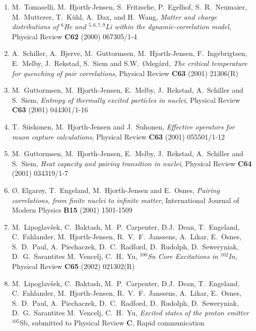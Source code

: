 \begin{enumerate}
\item 
      M.~Tomaselli, M.~Hjorth-Jensen, S.~Fritzsche, P.~Egelhof, 
      S.~R.~Neumaier, M.~Mutterer, T.~K\"uhl, A.~Dax, and H.~Wang,
      {\em Matter and charge distributions of $^6$He and $^{5,6,7,9}$Li
           within the dynamic-correlation model},  
       Physical Review {\bf C62} (2000) 067305/1-4
\item  A.\ Schiller, A.\ Bjerve, M.\ Guttormsen, M.\ Hjorth-Jensen,
       F.\ Ingebrigtsen, E.\ Melby,  J.\ Rekstad,  S.\ Siem and
       S.W.\ \O deg\aa rd,  
       {\em The critical temperature for quenching of pair correlations},
       Physical Review {\bf C63} (2001) 21306(R)
\item  M.\ Guttormsen, M.\ Hjorth-Jensen, E.\ Melby,  
       J.\ Rekstad,  A.\ Schiller and S.\ Siem,
       {\em Entropy of thermally excited particles in nuclei},
       Physical Review {\bf C63} (2001) 044301/1-16
\item T.\ Siiskonen, M.\ Hjorth-Jensen and J.\ Suhonen, {\em  Effective
      operators for muon capture calculations}, Physical Review {\bf C63}
      (2001) 055501/1-12 

\item M.\ Guttormsen, M.\ Hjorth-Jensen, E.\ Melby,  
       J.\ Rekstad,  A.\ Schiller and S.\ Siem,
       {\em Heat capacity and pairing transition in nuclei},
       Physical Review {\bf C64} (2001) 034319/1-7
\item
    \O. Elgar\o y, T.\ Engeland, M.\ Hjorth-Jensen and E.\ Osnes,
    {\em Pairing correlations, from finite nuclei to infinite matter},
    International Journal of Modern Physics {\bf B15} (2001) 1501-1509

\item 
M.~Lipoglav\v{s}ek, C.~Baktash,
M.~P.~Carpenter, D.J.~Dean, T.~Engeland, C.~Fahlander,
M.~Hjorth-Jensen, R.~V.~F.~Janssens, A.~Likar,
E.~Osnes, S.~D.~Paul, A.~Piechaczek, D.~C.~Radford,
D.~Rudolph, D.~Seweryniak, D.~G.~Sarantites M.~Vencelj, C.~H.~Yu,
{\em $^{100}$Sn Core Excitations in $^{102}$In}, 
Physical Review {\bf C65} (2002) 021302(R) 


\item 
M.~Lipoglav\v{s}ek, C.~Baktash,
M.~P.~Carpenter, D.J.~Dean, T.~Engeland, C.~Fahlander,
M.~Hjorth-Jensen, R.~V.~F.~Janssens, A.~Likar,
E.~Osnes, S.~D.~Paul, A.~Piechaczek, D.~C.~Radford,
D.~Rudolph, D.~Seweryniak, D.~G.~Sarantites M.~Vencelj, C.~H.~Yu,
{\em Excited states of the proton emitter} $^{105}$Sb, 
submitted to Physical Review {\bf C}, Rapid communication



\end{enumerate}
